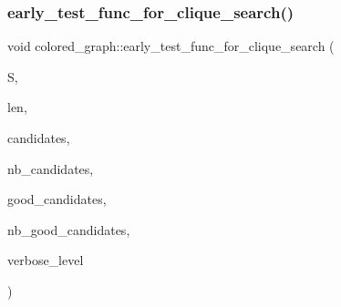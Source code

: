 \subsubsection{\texorpdfstring{early\+\_\+test\+\_\+func\+\_\+for\+\_\+clique\+\_\+search()}{early\_test\_func\_for\_clique\_search()}}
{\footnotesize\ttfamily void colored\+\_\+graph\+::early\+\_\+test\+\_\+func\+\_\+for\+\_\+clique\+\_\+search (\begin{DoxyParamCaption}\item[{\mbox{\hyperlink{galois_8h_a09fddde158a3a20bd2dcadb609de11dc}{I\+NT}} $\ast$}]{S,  }\item[{\mbox{\hyperlink{galois_8h_a09fddde158a3a20bd2dcadb609de11dc}{I\+NT}}}]{len,  }\item[{\mbox{\hyperlink{galois_8h_a09fddde158a3a20bd2dcadb609de11dc}{I\+NT}} $\ast$}]{candidates,  }\item[{\mbox{\hyperlink{galois_8h_a09fddde158a3a20bd2dcadb609de11dc}{I\+NT}}}]{nb\+\_\+candidates,  }\item[{\mbox{\hyperlink{galois_8h_a09fddde158a3a20bd2dcadb609de11dc}{I\+NT}} $\ast$}]{good\+\_\+candidates,  }\item[{\mbox{\hyperlink{galois_8h_a09fddde158a3a20bd2dcadb609de11dc}{I\+NT}} \&}]{nb\+\_\+good\+\_\+candidates,  }\item[{\mbox{\hyperlink{galois_8h_a09fddde158a3a20bd2dcadb609de11dc}{I\+NT}}}]{verbose\+\_\+level }\end{DoxyParamCaption})}

\mbox{\label{classcolored__graph_a0d66f950aadf478e4e02729c5a02e0cf}} 
